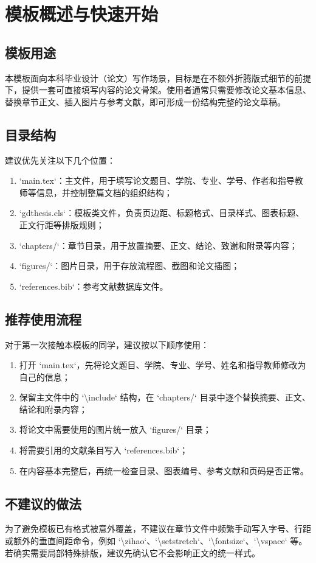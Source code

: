 \chapter{模板概述与快速开始}

\section{模板用途}
本模板面向本科毕业设计（论文）写作场景，目标是在不额外折腾版式细节的前提下，提供一套可直接填写内容的论文骨架。使用者通常只需要修改论文基本信息、替换章节正文、插入图片与参考文献，即可形成一份结构完整的论文草稿。

\section{目录结构}
建议优先关注以下几个位置：

\begin{enumerate}
\item `main.tex`：主文件，用于填写论文题目、学院、专业、学号、作者和指导教师等信息，并控制整篇文档的组织结构；
\item `gdthesis.cls`：模板类文件，负责页边距、标题格式、目录样式、图表标题、正文行距等排版规则；
\item `chapters/`：章节目录，用于放置摘要、正文、结论、致谢和附录等内容；
\item `figures/`：图片目录，用于存放流程图、截图和论文插图；
\item `references.bib`：参考文献数据库文件。
\end{enumerate}

\section{推荐使用流程}
对于第一次接触本模板的同学，建议按以下顺序使用：

\begin{enumerate}
\item 打开 `main.tex`，先将论文题目、学院、专业、学号、姓名和指导教师修改为自己的信息；
\item 保留主文件中的 `\textbackslash include` 结构，在 `chapters/` 目录中逐个替换摘要、正文、结论和附录内容；
\item 将论文中需要使用的图片统一放入 `figures/` 目录；
\item 将需要引用的文献条目写入 `references.bib`；
\item 在内容基本完整后，再统一检查目录、图表编号、参考文献和页码是否正常。
\end{enumerate}

\section{不建议的做法}
为了避免模板已有格式被意外覆盖，不建议在章节文件中频繁手动写入字号、行距或额外的垂直间距命令，例如 `\textbackslash zihao`、`\textbackslash setstretch`、`\textbackslash fontsize`、`\textbackslash vspace` 等。若确实需要局部特殊排版，建议先确认它不会影响正文的统一样式。
